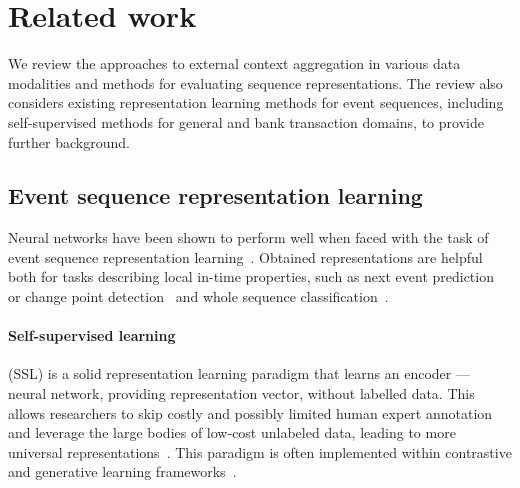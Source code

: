 \section{Related work}
\label{lit_rewiev}

We review the approaches to external context aggregation in various data modalities and methods for evaluating sequence representations. 
The review also considers existing representation learning methods for event sequences, including self-supervised methods for general and bank transaction domains, to provide further background.

\subsection{Event sequence representation learning}
Neural networks have been shown to perform well when faced with the task of event sequence representation learning~\cite{babaev2022coles}.
Obtained representations are helpful both for tasks describing local in-time properties, such as next event prediction~\cite{zhuzhel2023continuous} or change point detection~\cite{deldari2021time,ala2022deep} and whole sequence classification~\cite{bin2022review,jaiswal2020survey}.

\paragraph{Self-supervised learning} (SSL) is a solid representation learning paradigm that learns an encoder --- neural network, providing representation vector, without labelled data. 
This allows researchers to skip costly and possibly limited human expert annotation and leverage the large bodies of low-cost unlabeled data, leading to more universal representations~\cite{caron2021emerging}.
This paradigm is often implemented within contrastive and generative learning frameworks~\cite{zhang2020self,liu2023ssl}. 

